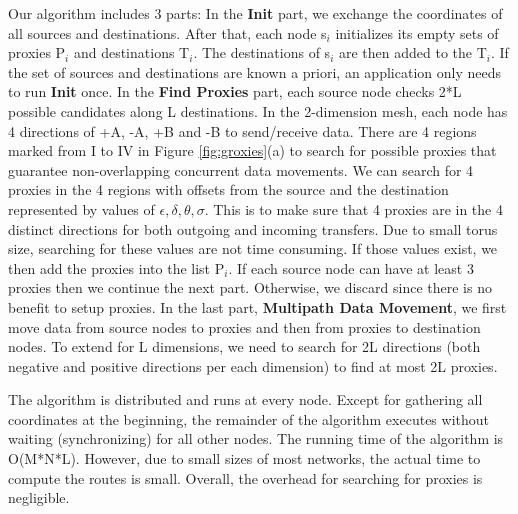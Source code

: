 \documentclass[final,5p,times]{elsarticle}
\begin{document}
Our algorithm includes 3 parts: In the \textbf{Init} part, we exchange the coordinates of all sources and destinations. After that, each node s$_i$ initializes its empty sets of proxies P$_i$ and destinations T$_i$. The destinations of s$_i$ are then added to the T$_i$. If the set of sources and destinations are known a priori, an application only needs to run \textbf{Init} once. In the \textbf{Find Proxies} part, each source node checks 2*L possible candidates along L destinations. In the 2-dimension mesh, each node has 4 directions of +A, -A, +B and -B to send/receive data. There are 4 regions marked from I to IV in Figure \ref{fig:groxies}(a) to search for possible proxies that guarantee non-overlapping concurrent data movements. We can search for 4 proxies in the 4 regions with offsets from the source and the destination represented by values of $\epsilon, \delta, \theta, \sigma$. This is to make sure that 4 proxies are in the 4 distinct directions for both outgoing and incoming transfers.  Due to small torus size, searching for these values are not time consuming. If those values exist, we then add the proxies into the list P$_i$. If each source node can have at least 3 proxies then we continue the next part. Otherwise, we discard since there is no benefit to setup proxies. In the last part, \textbf{Multipath Data Movement}, we first move data from source nodes to proxies and then from proxies to destination nodes. To extend for L dimensions, we need to search for 2L directions (both negative and positive directions per each dimension) to find at most 2L proxies.

The algorithm is distributed and runs at every node. Except for gathering all coordinates at the beginning, the remainder of the algorithm executes without waiting (synchronizing) for all other nodes. The running time of the algorithm is O(M*N*L). However, due to small sizes of most networks, the actual time to compute the routes is small. Overall, the overhead for searching for proxies is negligible.
\end{document}
